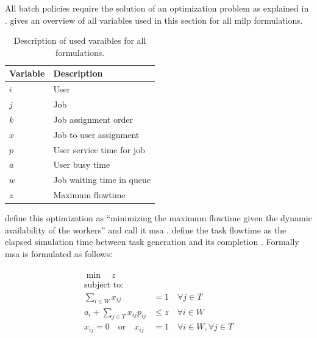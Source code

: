 All batch policies require the solution of an optimization problem as explained in .  gives an overview of all variables used in this section for all \gls{milp} formulations.

\begin{table}[!ht]
\centering
\begin{tabular}{@{}ll@{}}
\toprule
Variable & Description \\ \midrule
$i$         & User            \\
$j$         & Job            \\
$k$         & Job assignment order            \\
$x$         & Job to user assignment            \\
$p$         & User service time for job            \\
$a$         & User busy time            \\
$w$         & Job waiting time in queue            \\
$z$         & Maximum flowtime            \\ \bottomrule
\end{tabular}
\caption{Description of used varaibles for all  formulations.}
\label{tab:milp_variables}
\end{table}

\citet{Zeng2005} define this optimization as ``minimizing the maximum flowtime given the dynamic availability of the workers'' and call it \gls{msa} \citep[p. 7]{Zeng2005}. \citet{Zeng2005} define the task flowtime as the elapsed simulation time between task generation and its completion \citep{Zeng2005,Baker1974}. Formally \gls{msa} is formulated as follows:

\begin{align}
	\begin{split}
	    \min \quad z\\
	    \text{subject to:} \\
	    \sum_{i \in W} x_{ij} &= 1 \quad \forall j \in T\\
	    a_i + \sum_{j \in T} x_{ij} p_{ij} &\leq z \quad \forall i \in W\\
	    x_{ij}=0 \quad \text{or} \quad x_{ij} &=1 \quad \forall i \in W, \forall j \in T
	\end{split}
\end{align}

